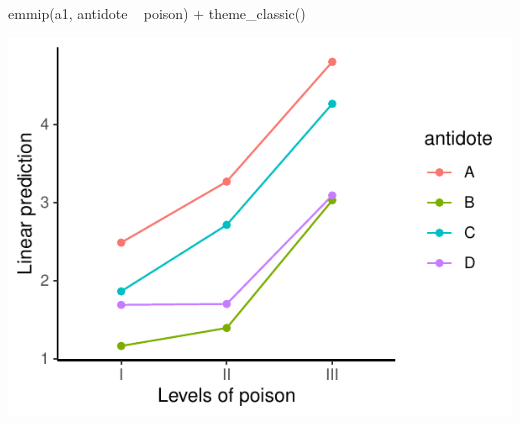\documentclass[a4paper]{article}
\begin{document}
\begin{minipage}[t]{0.49\textwidth}
\begin{Schunk}
\begin{Sinput}
emmip(a1, antidote ~ poison) +
  theme_classic()
\end{Sinput}


{\centering \includegraphics[width=\maxwidth]{figure/listings-unnamed-chunk-319-1} 

}

\end{Schunk}
\end{minipage}
\end{document}
